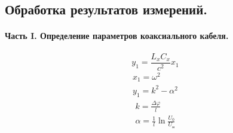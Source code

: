 \documentclass{report}
\begin{document}
\subsection{Обработка результатов измерений.}
\paragraph{Часть I. Определение параметров коаксиального кабеля.}
\begin{equation}
	y_1 = \frac{L_x C_x}{c^2} x_1
\end{equation}
\begin{gather}
	x_1 = \omega^2 \\
	y_1 = k^2 - \alpha^2
\end{gather}
\begin{gather*}
	k = \frac{\Delta \varphi}{l} \\
	\alpha = \frac{1}{l} \ln{\frac{U_0}{U_\text{н}}}
\end{gather*}

\begin{figure}[H]
	\centering
	
\end{figure}
\end{document}
